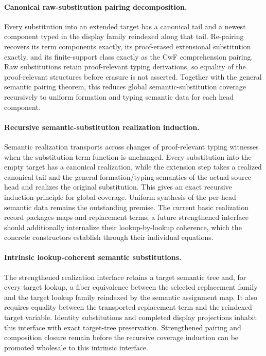 \documentclass[11pt]{article}
\theoremstyle{definition}
\begin{document}
\paragraph{Canonical raw-substitution pairing decomposition.}
Every substitution into an extended target has a canonical tail and a newest
component typed in the display family reindexed along that tail. Re-pairing
recovers its term components exactly, its proof-erased extensional substitution
exactly, and its finite-support class exactly as the CwF comprehension pairing.
Raw substitutions retain proof-relevant typing derivations, so equality of the
proof-relevant structures before erasure is not asserted. Together with the
general semantic pairing theorem, this reduces global semantic-substitution
coverage recursively to uniform formation and typing semantic data for each
head component.

\paragraph{Recursive semantic-substitution realization induction.}
Semantic realization transports across changes of proof-relevant typing
witnesses when the substitution term function is unchanged. Every substitution
into the empty target has a canonical realization, while the extension step
takes a realized canonical tail and the general formation/typing semantics of
the actual source head and realizes the original substitution. This gives an
exact recursive induction principle for global coverage. Uniform synthesis of
the per-head semantic data remains the outstanding premise. The current basic
realization record packages maps and replacement terms; a future strengthened
interface should additionally internalize their lookup-by-lookup coherence,
which the concrete constructors establish through their individual equations.

\paragraph{Intrinsic lookup-coherent semantic substitutions.}
The strengthened realization interface retains a target semantic tree and, for
every target lookup, a fiber equivalence between the selected replacement
family and the target lookup family reindexed by the semantic assignment map.
It also requires equality between the transported replacement term and the
reindexed target variable. Identity substitutions and completed display
projections inhabit this interface with exact target-tree preservation.
Strengthened pairing and composition closure remain before the recursive
coverage induction can be promoted wholesale to this intrinsic interface.
\end{document}
